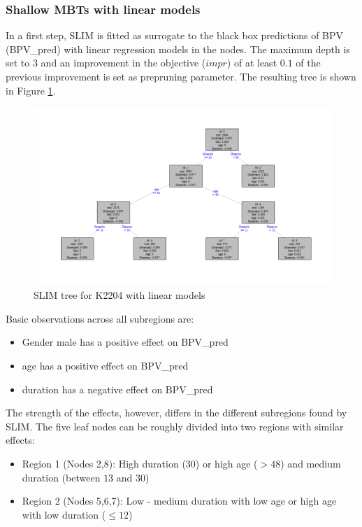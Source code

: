\subsubsection{Shallow MBTs with linear models}
In a first step, SLIM is fitted as surrogate to the black box predictions of BPV (BPV\_pred) with linear regression models in the nodes. The maximum depth is set to 3 and an improvement in the objective ($impr$) of at least $0.1$ of the previous improvement is set as prepruning parameter.
 The resulting tree is shown in Figure \ref{fig:ins_slim_lm_tree}.

 \begin{figure}[!htb]
     \centering     
     \includegraphics[width = 14cm]{Figures/insurance_use_case/k2204_BPV/slim_lm_tree.png}
     \caption{SLIM tree for K2204 with linear models}
     \label{fig:ins_slim_lm_tree}
 \end{figure}

Basic observations across all subregions are:
\begin{itemize}
    \item Gender male has a positive effect on BPV\_pred
    \item age has a positive effect on BPV\_pred
    \item duration has a negative effect on BPV\_pred
\end{itemize}

The strength of the effects, however, differs in the different subregions found by SLIM.
The five leaf nodes can be roughly divided into two regions with similar effects:
\begin{itemize}
    \item Region 1 (Nodes 2,8): High duration ($30$) or high age ($>48$) and medium duration (between $13$ and $30$)
    \item Region 2 (Nodes 5,6,7): Low - medium duration with low age or high age with low duration ($\leq 12$)
\end{itemize}


